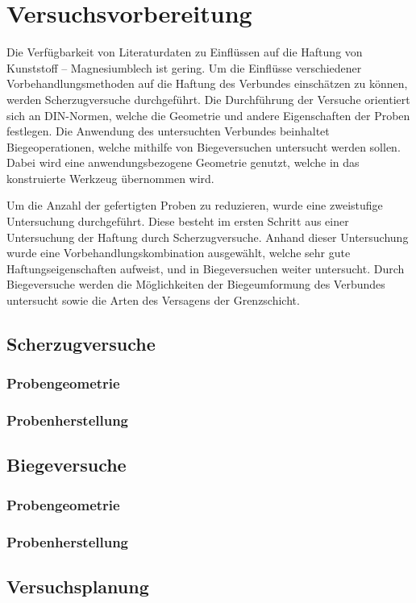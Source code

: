 \chapter{Versuchsvorbereitung}\label{ch:vorbereitung}

Die Verfügbarkeit von Literaturdaten zu Einflüssen auf die Haftung von Kunststoff – Magnesiumblech ist gering.
Um die Einflüsse verschiedener Vorbehandlungsmethoden auf die Haftung des Verbundes einschätzen zu können, werden Scherzugversuche durchgeführt.
Die Durchführung der Versuche orientiert sich an DIN-Normen, welche die Geometrie und andere Eigenschaften der Proben festlegen.
Die Anwendung des untersuchten Verbundes beinhaltet Biegeoperationen, welche mithilfe von Biegeversuchen untersucht werden sollen.
Dabei wird eine anwendungsbezogene Geometrie genutzt, welche in das konstruierte Werkzeug übernommen wird.

Um die Anzahl der gefertigten Proben zu reduzieren, wurde eine zweistufige Untersuchung durchgeführt.
Diese besteht im ersten Schritt aus einer Untersuchung der Haftung durch Scherzugversuche.
Anhand dieser Untersuchung wurde eine Vorbehandlungskombination ausgewählt, welche sehr gute Haftungseigenschaften aufweist, und in Biegeversuchen weiter untersucht.
Durch Biegeversuche werden die Möglichkeiten der Biegeumformung des Verbundes untersucht sowie die Arten des Versagens der Grenzschicht.

\section{Scherzugversuche}\label{sec:scherzug}

\subsection{Probengeometrie}\label{subsec:probengeometrie}

\subsection{Probenherstellung}\label{subsec:probenherstellung}

\section{Biegeversuche}\label{sec:Biegen}

\subsection{Probengeometrie}\label{subsec:probengeometrie2}

\subsection{Probenherstellung}\label{subsec:probenherstellung2}

\section{Versuchsplanung}\label{sec:Planung}